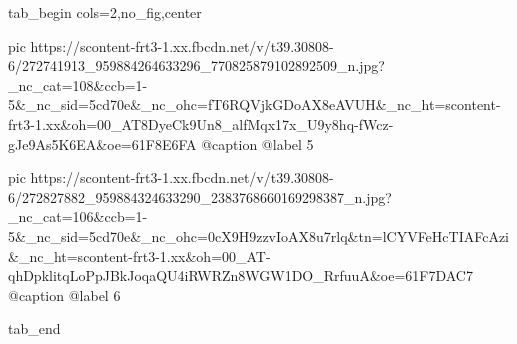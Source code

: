  
 
 
 
 


\ifcmt
  tab_begin cols=2,no_fig,center

     pic https://scontent-frt3-1.xx.fbcdn.net/v/t39.30808-6/272741913_959884264633296_770825879102892509_n.jpg?_nc_cat=108&ccb=1-5&_nc_sid=5cd70e&_nc_ohc=fT6RQVjkGDoAX8eAVUH&_nc_ht=scontent-frt3-1.xx&oh=00_AT8DyeCk9Un8_alfMqx17x_U9y8hq-fWcz-gJe9As5K6EA&oe=61F8E6FA
     @caption @label 5

     pic https://scontent-frt3-1.xx.fbcdn.net/v/t39.30808-6/272827882_959884324633290_2383768660169298387_n.jpg?_nc_cat=106&ccb=1-5&_nc_sid=5cd70e&_nc_ohc=0cX9H9zzvIoAX8u7rlq&tn=lCYVFeHcTIAFcAzi&_nc_ht=scontent-frt3-1.xx&oh=00_AT-qhDpklitqLoPpJBkJoqaQU4iRWRZn8WGW1DO_RrfuuA&oe=61F7DAC7
     @caption @label 6

  tab_end
\fi
